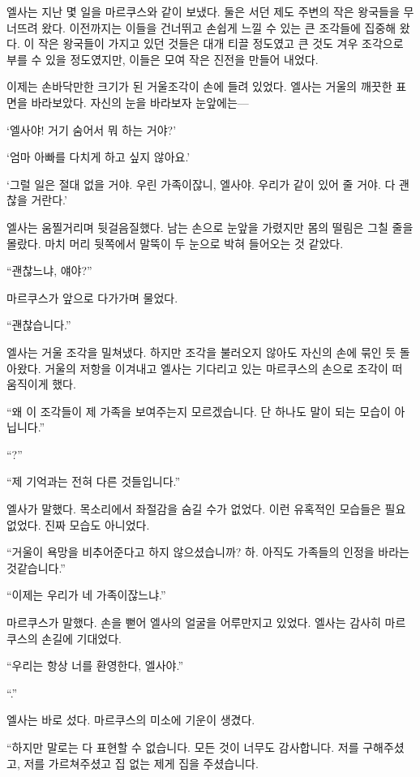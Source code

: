 엘사는 지난 몇 일을 마르쿠스와 같이 보냈다. 둘은 서던 제도 주변의 작은 왕국들을 무너뜨려 왔다. 이전까지는 이들을 건너뛰고 손쉽게 느낄 수 있는 큰 조각들에 집중해 왔다. 이 작은 왕국들이 가지고 있던 것들은 대개 티끌 정도였고 큰 것도 겨우 조각으로 부를 수 있을 정도였지만, 이들은 모여 작은 진전을 만들어 내었다.

이제는 손바닥만한 크기가 된 거울조각이 손에 들려 있었다. 엘사는 거울의 깨끗한 표면을 바라보았다. 자신의 눈을 바라보자 눈앞에는—

`엘사야! 거기 숨어서 뭐 하는 거야?'

`엄마 아빠를 다치게 하고 싶지 않아요.'

`그럴 일은 절대 없을 거야. 우린 가족이잖니, 엘사야. 우리가 같이 있어 줄 거야. 다 괜찮을 거란다.'

엘사는 움찔거리며 뒷걸음질했다. 남는 손으로 눈앞을 가렸지만 몸의 떨림은 그칠 줄을 몰랐다. 마치 머리 뒷쪽에서 말뚝이 두 눈으로 박혀 들어오는 것 같았다.

``괜찮느냐, 얘야?''

마르쿠스가 앞으로 다가가며 물었다.

``괜찮습니다.''

엘사는 거울 조각을 밀쳐냈다. 하지만 조각을 불러오지 않아도 자신의 손에 묶인 듯 돌아왔다. 거울의 저항을 이겨내고 엘사는 기다리고 있는 마르쿠스의 손으로 조각이 떠 움직이게 했다.

``왜 이 조각들이 제 가족을 보여주는지 모르겠습니다. 단 하나도 말이 되는 모습이 아닙니다.''

``?''

``제 기억과는 전혀 다른 것들입니다.''

엘사가 말했다. 목소리에서 좌절감을 숨길 수가 없었다. 이런 유혹적인 모습들은 필요 없었다. 진짜 모습도 아니었다.

``거울이 욕망을 비추어준다고 하지 않으셨습니까? 하. 아직도 가족들의 인정을 바라는 것같습니다.''

``이제는 우리가 네 가족이잖느냐.''

마르쿠스가 말했다. 손을 뻗어 엘사의 얼굴을 어루만지고 있었다. 엘사는 감사히 마르쿠스의 손길에 기대었다.

``우리는 항상 너를 환영한다, 엘사야.''

``.''

엘사는 바로 섰다. 마르쿠스의 미소에 기운이 생겼다.

``하지만 말로는 다 표현할 수 없습니다. 모든 것이 너무도 감사합니다. 저를 구해주셨고, 저를 가르쳐주셨고 집 없는 제게 집을 주셨습니다.

